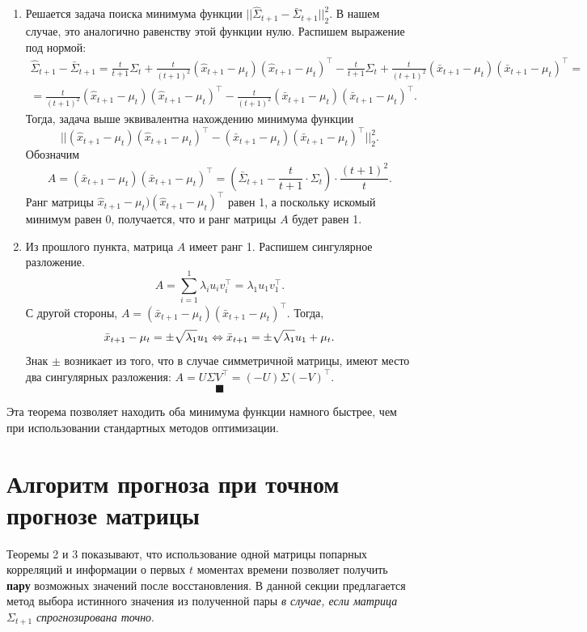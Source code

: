 \documentclass{article}
\begin{document}
\begin{enumerate}
	\item Решается задача поиска минимума функции $||\hat{\Sigma}_{t+1} - \bar{\Sigma}_{t+1}||_2^2$. В нашем случае, это аналогично равенству этой функции нулю. Распишем выражение под нормой:
	\begin{gather*}
		\hat{\Sigma}_{t+1} - \bar{\Sigma}_{t+1} = \frac{t}{t+1}\Sigma_t + \frac{t}{(t+1)^2}(\hat{x}_{t+1}-\mu_t)(\hat{x}_{t+1}-\mu_t)^\intercal - \frac{t}{t+1}\Sigma_t + \frac{t}{(t+1)^2}(\bar{x}_{t+1}-\mu_t)(\bar{x}_{t+1}-\mu_t)^\intercal =\\
		=\frac{t}{(t+1)^2}(\hat{x}_{t+1}-\mu_t)(\hat{x}_{t+1}-\mu_t)^\intercal -\frac{t}{(t+1)^2}(\bar{x}_{t+1}-\mu_t)(\bar{x}_{t+1}-\mu_t)^\intercal.
 	\end{gather*}
 	Тогда, задача выше эквивалентна нахождению минимума функции \[||(\hat{x}_{t+1}-\mu_t)(\hat{x}_{t+1}-\mu_t)^\intercal-(\bar{x}_{t+1}-\mu_t)(\bar{x}_{t+1}-\mu_t)^\intercal||_2^2.\]
 	Обозначим \[A = (\bar{x}_{t+1}-\mu_t)(\bar{x}_{t+1}-\mu_t)^\intercal = \left(\bar{\Sigma}_{t+1} - \frac{t}{t+1} \cdot \Sigma_t \right) \cdot \frac{(t+1)^2}{t}.\]
 	Ранг матрицы $\hat{x}_{t+1}-\mu_t)(\hat{x}_{t+1}-\mu_t)^\intercal$ равен 1, а поскольку искомый минимум равен 0, получается, что и ранг матрицы $A$ будет равен 1.
 	
 	\item Из прошлого пункта, матрица $A$ имеет ранг 1. Распишем сингулярное разложение. \[
 		A = \sum_{i=1}^{1} \lambda_i u_i v_i^\intercal = \lambda_1 u_1 v_1^\intercal.
 	\]
 	С другой стороны, $A = (\bar{x}_{t+1}-\mu_t)(\bar{x}_{t+1}-\mu_t)^\intercal$. Тогда, \[
 	\bar{x}_{t+1}-\mu_t = \pm\sqrt{\lambda_1} u_1 \Leftrightarrow\\
 	\bar{x}_{t+1} = \pm\sqrt{\lambda_1} u_1 + \mu_t.
 	\]
 	Знак $\pm$ возникает из того, что в случае симметричной матрицы, имеют место два сингулярных разложения: $A=U\Sigma V^\intercal=(-U)\Sigma (-V)^\intercal$.
 	$$ \blacksquare $$
\end{enumerate}

Эта теорема позволяет находить оба минимума функции намного быстрее, чем при использовании стандартных методов оптимизации.

\section{Алгоритм прогноза при точном прогнозе матрицы}

Теоремы 2 и 3 показывают, что использование одной матрицы попарных корреляций и информации о первых $t$ моментах времени позволяет получить \textbf{пару} возможных значений после восстановления. В данной секции предлагается метод выбора истинного значения из полученной пары \textit{в случае, если матрица}  $\Sigma_{t+1}$  \textit{спрогнозирована точно}.
\end{document}

